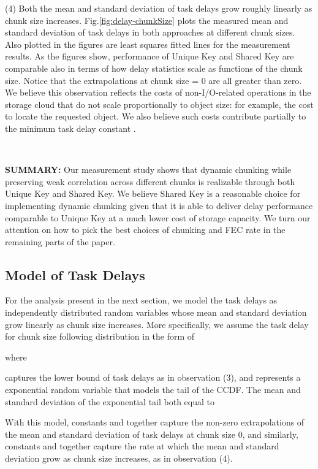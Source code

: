 \documentclass[journal]{IEEEtran}
\begin{document}
(4)
\label{obs:linearGroth}
Both the mean and standard deviation of task delays grow roughly linearly as chunk size increases. Fig.\ref{fig:delay-chunkSize} plots the measured mean and standard deviation of task delays in both approaches at different chunk sizes. Also plotted in the figures are least squares fitted lines for the measurement results. As the figures show, performance of Unique Key and Shared Key are comparable also in terms of how delay statistics scale as functions of the chunk size. Notice that the extrapolations at chunk size = 0 are all greater than zero. We believe this observation reflects the costs of non-I/O-related operations in the storage cloud that do not scale proportionally to object size: for example, the cost to locate the requested object. We also believe such costs contribute partially to the minimum task delay constant .

~

\noindent
{\bf SUMMARY:}
Our measurement study shows that dynamic chunking while preserving weak correlation across different chunks is realizable through both Unique Key and Shared Key. We believe Shared Key is a reasonable choice for implementing dynamic chunking given that it is able to deliver delay performance comparable to Unique Key at a much lower cost of storage capacity. We turn our attention on how to pick the best choices of chunking and FEC rate in the remaining parts of the paper. 

\subsection{Model of Task Delays}
\label{ssec:model:delay}
For the analysis present in the next section,
we model the task delays as independently distributed random variables whose mean and standard deviation grow linearly as chunk size  increases. More specifically, we assume the task delay  for chunk size  following distribution in the form of 

where 

captures the lower bound of task delays as in observation (3), and  represents a exponential random variable that models the tail of the CCDF. The mean and standard deviation of the exponential tail both equal to  

With this model, constants
 and  together capture the non-zero extrapolations of the mean and standard deviation of task delays at chunk size 0, and similarly, constants  and  together capture the rate at which the mean and standard deviation grow as chunk size increases, as in observation (4).
\end{document}
